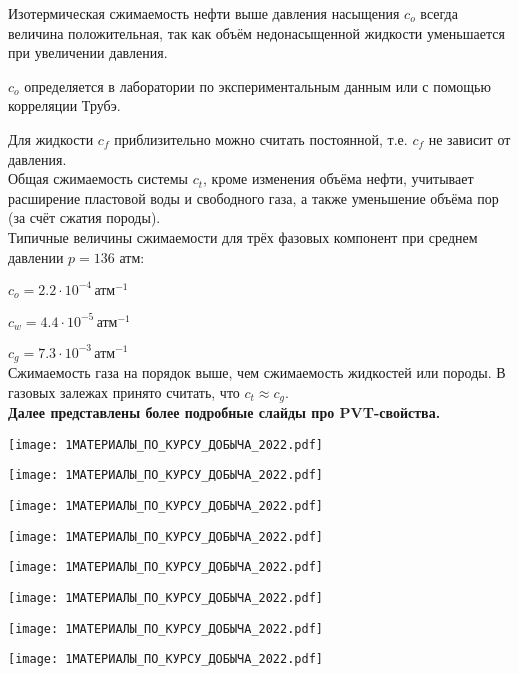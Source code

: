 Изотермическая сжимаемость нефти выше давления насыщения $c_o$ всегда величина положительная, так как объём недонасыщенной жидкости уменьшается при увеличении давления.

$c_o$ определяется в лаборатории по экспериментальным данным или с помощью корреляции Трубэ.

Для жидкости $c_f$ приблизительно можно считать постоянной, т.е. $c_f$ не зависит от давления.
\\

Общая сжимаемость системы $c_t$, кроме изменения объёма нефти, учитывает расширение пластовой воды и свободного газа, а также уменьшение объёма пор (за счёт сжатия породы).
\\

Типичные величины сжимаемости для трёх фазовых компонент при среднем давлении $p=136\text{ атм}$:

$c_o=2.2\cdot 10^{-4} \, \text{атм}^{-1}$

$c_w=4.4\cdot 10^{-5} \, \text{атм}^{-1}$

$c_g=7.3\cdot 10^{-3} \, \text{атм}^{-1}$
\\

Сжимаемость газа на порядок выше, чем сжимаемость жидкостей или породы.
В газовых залежах принято считать, что $c_t\approx c_g$.
\\

\textbf{Далее представлены более подробные слайды про PVT-свойства.}

\texttt{[image: 1МАТЕРИАЛЫ\_ПО\_КУРСУ\_ДОБЫЧА\_2022.pdf]}

\texttt{[image: 1МАТЕРИАЛЫ\_ПО\_КУРСУ\_ДОБЫЧА\_2022.pdf]}

\texttt{[image: 1МАТЕРИАЛЫ\_ПО\_КУРСУ\_ДОБЫЧА\_2022.pdf]}

\texttt{[image: 1МАТЕРИАЛЫ\_ПО\_КУРСУ\_ДОБЫЧА\_2022.pdf]}

\texttt{[image: 1МАТЕРИАЛЫ\_ПО\_КУРСУ\_ДОБЫЧА\_2022.pdf]}

\texttt{[image: 1МАТЕРИАЛЫ\_ПО\_КУРСУ\_ДОБЫЧА\_2022.pdf]}

\texttt{[image: 1МАТЕРИАЛЫ\_ПО\_КУРСУ\_ДОБЫЧА\_2022.pdf]}

\texttt{[image: 1МАТЕРИАЛЫ\_ПО\_КУРСУ\_ДОБЫЧА\_2022.pdf]}

